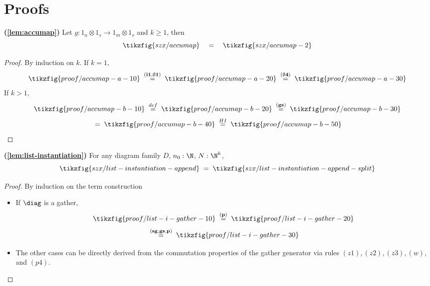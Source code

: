 \section{Proofs}%
\label{sec:proofs}

\begin{lemma}{\!\textbf{(\ref{lem:accumap})}}
    Let $g : 1_n \otimes 1_s \to 1_{m} \otimes 1_s$ and $k\geq 1$, then
    \[
        \tikzfig{szx/accumap}
        \quad=\quad%
        \tikzfig{szx/accumap-2}
    \]
\end{lemma}

\begin{proof}
    By induction on $k$.
    If $k=1$,
    \[
        \tikzfig{proof/accumap-a-10}
        \;\overset{\scriptstyle{\bf{(i1, \emptyset 1)}}}{=}\;
        \tikzfig{proof/accumap-a-20}
        \;\overset{\scriptstyle{\bf{(\emptyset 4)}}}{=}\;
        \tikzfig{proof/accumap-a-30}
    \]
    If $k>1$,
    \[
        \tikzfig{proof/accumap-b-10}
        \;\overset{\scriptstyle{def}}{=}\;
        \tikzfig{proof/accumap-b-20}
        \;\overset{\scriptstyle{\bf{(gs)}}}{=}\;
        \tikzfig{proof/accumap-b-30}
    \]
    \[
        \;=\;
        \tikzfig{proof/accumap-b-40}
        \;\overset{\scriptstyle{HI}}{=}\;
        \tikzfig{proof/accumap-b-50}
    \]
\end{proof}

\begin{lemma}{\!\textbf{(\ref{lem:list-instantiation})}}
    For any diagram family $D$, $n_0 : \N$, $N : \N^k$,
    \[
        \tikzfig{szx/list-instantiation-append}
        \;=\;
        \tikzfig{szx/list-instantiation-append-split}
    \]
\end{lemma}

\begin{proof}
    By induction on the term construction
    \begin{itemize}
        \item If $\diag$ is a gather, 
        \[
            \tikzfig{proof/list-i-gather-10}
            \;\overset{\scriptstyle{\bf{(p)}}}{=}\;
            \tikzfig{proof/list-i-gather-20}
        \]
        \[
            \;\overset{\scriptstyle{\bf{(sg,gs,p)}}}{=}\;
            \tikzfig{proof/list-i-gather-30}
        \]
        \item The other cases can be directly derived from the commutation properties
        of the gather generator via rules $(z1), (z2), (z3), (w)$, and $(p4)$.
    \end{itemize}
\end{proof}

